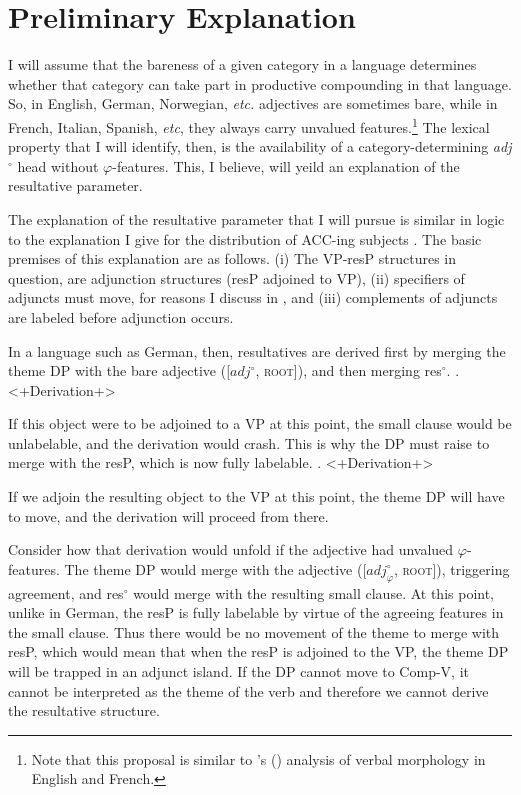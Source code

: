 \documentclass[letterpaper,12pt]{article}
\begin{document}
\section{Preliminary Explanation}
I will assume that the bareness of a given category in a language determines whether that category can take part in productive compounding in that language.
So, in English, German, Norwegian, \textit{etc.} adjectives are sometimes bare, while in French, Italian, Spanish, \textit{etc}, they always carry unvalued features.\footnote{Note that this proposal is similar to \citeauthor{lasnik1999verbal}'s (\citeyear{lasnik1999verbal}) analysis of verbal morphology in English and French.}
The lexical property that I will identify, then, is the availability of a category-determining \textit{adj}$^\circ$ head without $\varphi$-features.
This, I believe, will yeild an explanation of the resultative parameter.

The explanation of the resultative parameter that I will pursue is similar in logic to the explanation I give for the distribution of ACC-ing subjects \parencite{milway2016dogdays}.
The basic premises of this explanation are as follows.
(i) The VP-resP structures in question, are adjunction structures (resP adjoined to VP), (ii) specifiers of adjuncts must move, for reasons I discuss in \textcite{milway2016dogdays}, and (iii) complements of adjuncts are labeled before adjunction occurs.

In a language such as German, then, resultatives are derived first by merging the theme DP with the bare adjective ([$adj^\circ$, \textsc{root}]), and then merging res$^\circ$.
\ex. <+Derivation+>

If this object were to be adjoined to a VP at this point, the small clause would be unlabelable, and the derivation would crash.
This is why the DP must raise to merge with the resP, which is now fully labelable.
\ex. <+Derivation+>

If we adjoin the resulting object to the VP at this point, the theme DP will have to move, and the derivation will proceed from there.

Consider how that derivation would unfold if the adjective had unvalued $\varphi$-features.
The theme DP would merge with the adjective ([$adj^\circ_\varphi$, \textsc{root}]), triggering agreement, and res$^\circ$ would merge with the resulting small clause.
At this point, unlike in German, the resP is fully labelable by virtue of the agreeing features in the small clause.
Thus there would be no movement of the theme to merge with resP, which would mean that when the resP is adjoined to the VP, the theme DP will be trapped in an adjunct island.
If the DP cannot move to Comp-V, it cannot be interpreted as the theme of the verb and therefore we cannot derive the resultative structure.
\end{document}
